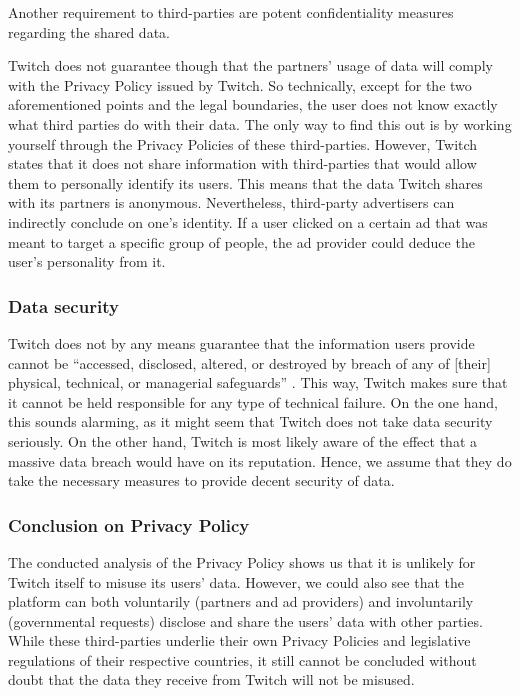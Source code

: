 Another requirement to third-parties are potent confidentiality measures regarding the shared data. 

Twitch does not guarantee though that the partners' usage of data will comply with the Privacy Policy issued by Twitch. So technically, except for the two aforementioned points and the legal boundaries, the user does not know exactly what third parties do with their data. The only way to find this out is by working yourself through the Privacy Policies of these third-parties. However, Twitch states that it does not share information with third-parties that would allow them to personally identify its users. This means that the data Twitch shares with its partners is anonymous. 
Nevertheless, third-party advertisers can indirectly conclude on one's identity. If a user clicked on a certain ad that was meant to target a specific group of people, the ad provider could deduce the user's personality from it. 

\subsubsection{Data security}
Twitch does not by any means guarantee that the information users provide cannot be ``accessed, disclosed, altered, or destroyed by breach of any of [their] physical, technical, or managerial safeguards'' \cite[Section~10]{twitch-privacy-policy}. This way, Twitch makes sure that it cannot be held responsible for any type of technical failure. On the one hand, this sounds alarming, as it might seem that Twitch does not take data security seriously. On the other hand, Twitch is most likely aware of the effect that a massive data breach would have on its reputation. Hence, we assume that they do take the necessary measures to provide decent security of data. 

\subsubsection{Conclusion on Privacy Policy}
The conducted analysis of the Privacy Policy shows us that it is unlikely for Twitch itself to misuse its users' data. 
However, we could also see that the platform can both voluntarily (partners and ad providers) and involuntarily (governmental requests) disclose and share the users' data with other parties. While these third-parties underlie their own Privacy Policies and legislative regulations of their respective countries, it still cannot be concluded without doubt that the data they receive from Twitch will not be misused. 


